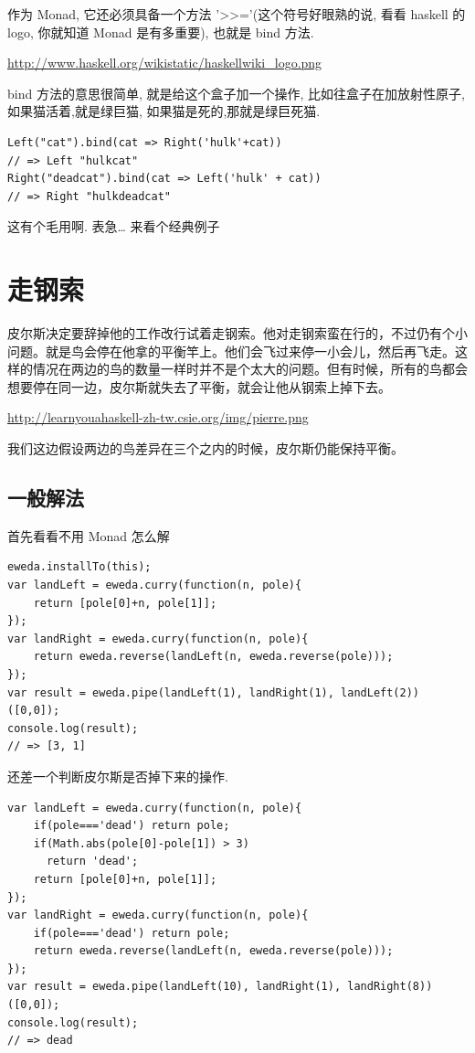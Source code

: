\documentclass[a5paper]{book}
\begin{document}
作为 Monad, 它还必须具备一个方法 '>>='(这个符号好眼熟的说, 看看 haskell
的 logo, 你就知道 Monad 是有多重要), 也就是 bind 方法.

\url{http://www.haskell.org/wikistatic/haskellwiki_logo.png}

bind 方法的意思很简单, 就是给这个盒子加一个操作,
比如往盒子在加放射性原子,如果猫活着,就是绿巨猫,
如果猫是死的,那就是绿巨死猫.

\begin{verbatim}
Left("cat").bind(cat => Right('hulk'+cat))
// => Left "hulkcat"
Right("deadcat").bind(cat => Left('hulk' + cat))
// => Right "hulkdeadcat"
\end{verbatim}

这有个毛用啊. 表急\ldots{} 来看个经典例子 

\chapter{走钢索}
\label{sec:orgheadline39}

皮尔斯决定要辞掉他的工作改行试着走钢索。他对走钢索蛮在行的，不过仍有个小问题。就是鸟会停在他拿的平衡竿上。他们会飞过来停一小会儿，然后再飞走。这样的情况在两边的鸟的数量一样时并不是个太大的问题。但有时候，所有的鸟都会想要停在同一边，皮尔斯就失去了平衡，就会让他从钢索上掉下去。

\url{http://learnyouahaskell-zh-tw.csie.org/img/pierre.png}

我们这边假设两边的鸟差异在三个之内的时候，皮尔斯仍能保持平衡。

\section{一般解法}
\label{sec:orgheadline37}

首先看看不用 Monad 怎么解

\begin{verbatim}
eweda.installTo(this);
var landLeft = eweda.curry(function(n, pole){
    return [pole[0]+n, pole[1]];
});
var landRight = eweda.curry(function(n, pole){
    return eweda.reverse(landLeft(n, eweda.reverse(pole)));
});
var result = eweda.pipe(landLeft(1), landRight(1), landLeft(2))([0,0]);
console.log(result);
// => [3, 1]
\end{verbatim}

还差一个判断皮尔斯是否掉下来的操作.

\begin{verbatim}
var landLeft = eweda.curry(function(n, pole){
    if(pole==='dead') return pole;
    if(Math.abs(pole[0]-pole[1]) > 3)
      return 'dead';
    return [pole[0]+n, pole[1]];
});
var landRight = eweda.curry(function(n, pole){
    if(pole==='dead') return pole;
    return eweda.reverse(landLeft(n, eweda.reverse(pole)));
});
var result = eweda.pipe(landLeft(10), landRight(1), landRight(8))([0,0]);
console.log(result);
// => dead
\end{verbatim}
\end{document}
